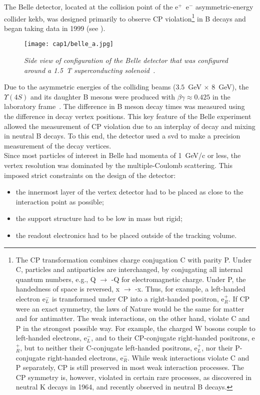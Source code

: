 \hskip 1cm The Belle detector, located at the collision point of the e$^+$~e$^-$
asymmetric-energy collider \gls{kekb}, was designed primarily to observe CP
violation\footnote{The CP transformation combines charge conjugation C with
  parity P. Under C, particles and antiparticles are interchanged, by
  conjugating all internal quantum numbers, e.g., Q $\to$ -Q for electromagnetic
  charge. Under P, the handedness of space is reversed, x $\to$ -x. Thus, for
  example, a left-handed electron e$^{-}_{L}$ is transformed under CP into a
  right-handed positron, e$^{+}_{R}$. If CP were an exact symmetry, the laws of
  Nature would be the same for matter and for antimatter. The weak interactions,
  on the other hand, violate C and P in the strongest possible way. For example,
  the charged W bosons couple to left-handed electrons, e$^{-}_{L}$, and to
  their CP-conjugate right-handed positrons, e$^{+}_{R}$, but to neither their
  C-conjugate left-handed positrons, e$^{+}_{L}$, nor their P-conjugate
  right-handed electrons, e$^{-}_{R}$. While weak interactions violate C and P
  separately, CP is still preserved in most weak interaction processes. The CP
  symmetry is, however, violated in certain rare processes, as discovered in
  neutral K decays in 1964, and recently observed in neutral B decays.} in B
decays and began taking data in 1999 (see ).
\begin{figure}[!htbp]
  \centering\texttt{[image: cap1/belle\_a.jpg]}
  \caption{\it Side view of configuration of the Belle detector that was
    configured around a 1.5~T superconducting
    solenoid~\cite{Abashian}.}\label{belle_a}
\end{figure}
Due to the asymmetric energies of the colliding beams ($3.5$~GeV $\times$
$8$~GeV), the $\Upsilon (4S)$ and its daughter B mesons were produced with
$\beta \gamma \approx 0.425$ in the laboratory frame~\cite{Belle}. The
difference in B meson decay times was measured using the difference in decay
vertex positions. This key feature of the Belle experiment allowed the
measurement of CP violation due to an interplay of decay and mixing in neutral B
decays. To this end, the detector used a \gls{svd} to make a precision
measurement of the decay
vertices.\\
Since most particles of interest in Belle had momenta of 1~GeV/c or less, the
vertex resolution was dominated by the multiple-Coulomb scattering.  This
imposed strict constraints on the design of the detector:
\begin{itemize}
\item the innermost layer of the vertex detector had to be placed as close to
  the interaction point as possible;
\item the support structure had to be low in mass but rigid;
\item the readout electronics had to be placed outside of the tracking volume.
\end{itemize}
